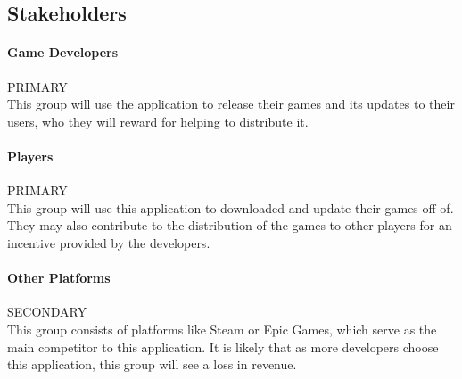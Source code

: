 
\subsection{Stakeholders}

\newcommand{\primary}{\hspace*{\fill}PRIMARY\\}
\newcommand{\secondary}{\hspace*{\fill}SECONDARY\\}
\newcommand{\tertiary}{\hspace*{\fill}TERTIARY\\}

\paragraph{Game Developers}\primary
This group will use the application to release their games and its updates to their users, who they will reward for helping to distribute it.

\paragraph{Players}\primary
This group will use this application to downloaded and update their games off of. They may also contribute to the distribution of the games to other players for an incentive provided by the developers.

\paragraph{Other Platforms}\secondary
This group consists of platforms like Steam or Epic Games, which serve as the main competitor to this application. It is likely that as more developers choose this application, this group will see a loss in revenue.
